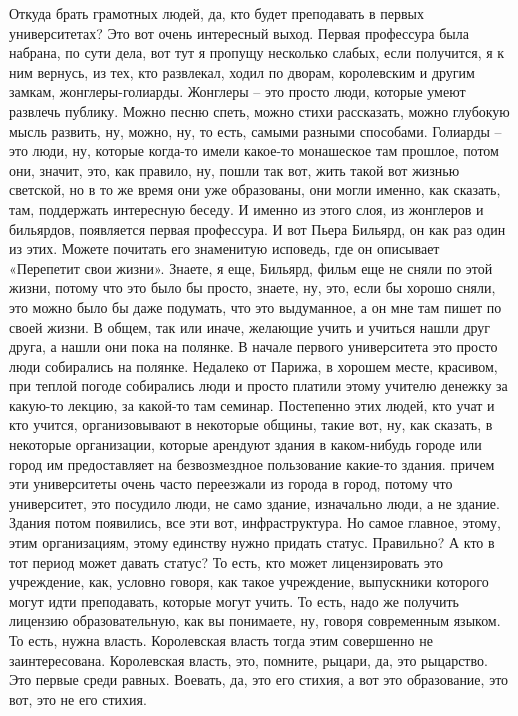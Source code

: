 Откуда брать грамотных людей, да, кто будет преподавать в первых
университетах? Это вот очень интересный выход. Первая профессура была набрана,
по сути дела, вот тут я пропущу несколько слабых, если получится, я к ним
вернусь, из тех, кто развлекал, ходил по дворам, королевским и другим замкам,
жонглеры-голиарды. Жонглеры – это просто люди, которые умеют развлечь публику.
Можно песню спеть, можно стихи рассказать, можно глубокую мысль развить, ну,
можно, ну, то есть, самыми разными способами. Голиарды – это люди, ну, которые
когда-то имели какое-то монашеское там прошлое, потом они, значит, это, как
правило, ну, пошли так вот, жить такой вот жизнью светской, но в то же время они
уже образованы, они могли именно, как сказать, там, поддержать интересную
беседу. И именно из этого слоя, из жонглеров и бильярдов, появляется первая
профессура. И вот Пьера Бильярд, он как раз один из этих. Можете почитать его
знаменитую исповедь, где он описывает «Перепетит свои жизни». Знаете, я еще,
Бильярд, фильм еще не сняли по этой жизни, потому что это было бы просто,
знаете, ну, это, если бы хорошо сняли, это можно было бы даже подумать, что это
выдуманное, а он мне там пишет по своей жизни. В общем, так или иначе, желающие
учить и учиться нашли друг друга, а нашли они пока на полянке. В начале первого
университета это просто люди собирались на полянке. Недалеко от Парижа, в
хорошем месте, красивом, при теплой погоде собирались люди и просто платили
этому учителю денежку за какую-то лекцию, за какой-то там семинар. Постепенно
этих людей, кто учат и кто учится, организовывают в некоторые общины, такие вот,
ну, как сказать, в некоторые организации, которые арендуют здания в каком-нибудь
городе или город им предоставляет на безвозмездное пользование какие-то здания.
причем эти университеты очень часто переезжали из города в город, потому что
университет, это посудило люди, не само здание, изначально люди, а не здание.
Здания потом появились, все эти вот, инфраструктура. Но самое главное, этому,
этим организациям, этому единству нужно придать статус. Правильно? А кто в тот
период может давать статус? То есть, кто может лицензировать это учреждение,
как, условно говоря, как такое учреждение, выпускники которого могут идти
преподавать, которые могут учить. То есть, надо же получить лицензию
образовательную, как вы понимаете, ну, говоря современным языком. То есть, нужна
власть. Королевская власть тогда этим совершенно не заинтересована. Королевская
власть, это, помните, рыцари, да, это рыцарство. Это первые среди равных.
Воевать, да, это его стихия, а вот это образование, это вот, это не его стихия.
